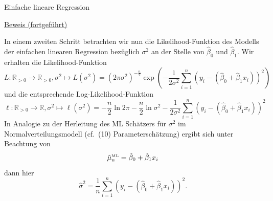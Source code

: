 \documentclass[
  8pt,
  ignorenonframetext,
]{beamer}
\begin{document}
\begin{frame}{Einfache lineare Regression}
\protect\hypertarget{einfache-lineare-regression-8}{}
\tiny
\setlength{\abovedisplayskip}{1pt}
\setlength{\belowdisplayskip}{1pt}

\underline{Beweis (fortgeführt)}

In einem zweiten Schritt betrachten wir nun die Likelihood-Funktion des
Modells der einfachen linearen Regression bezüglich \(\sigma^2\) an der
Stelle von \(\hat{\beta}_0\) und \(\hat{\beta}_1\). Wir erhalten die
Likelihood-Funktion \begin{equation}
L : \mathbb{R}_{>0} \to \mathbb{R}_{>0}, \sigma^2 \mapsto L(\sigma^2)
 = \left(2\pi\sigma^2\right)^{-\frac{n}{2}}\exp\left(-\frac{1}{2\sigma^2}\sum_{i=1}^n(y_i - (\hat{\beta}_0 + \hat{\beta}_1x_i))^2\right)
\end{equation} und die entsprechende Log-Likelihood-Funktion
\begin{equation}
\ell : \mathbb{R}_{>0} \to \mathbb{R}, \sigma^2 \mapsto \ell(\sigma^2)
 = -\frac{n}{2} \ln 2\pi - \frac{n}{2} \ln \sigma^2 -\frac{1}{2\sigma^2}\sum_{i=1}^n(y_i - (\hat{\beta}_0 + \hat{\beta}_1x_i))^2
\end{equation} In Analogie zu der Herleitung des ML Schätzers für
\(\sigma^2\) im Normalverteilungsmodell (cf.~(10) Parameterschätzung)
ergibt sich unter Beachtung von \begin{equation}
\hat{\mu}^{\mbox{\tiny ML}}_n = \hat{\beta}_0 + \hat{\beta}_1x_i
\end{equation} dann hier \begin{equation}
\hat{\sigma}^2 = \frac{1}{n}\sum_{i=1}^n (y_i - (\hat{\beta}_0 + \hat{\beta}_1x_i))^2.
\end{equation}
\end{frame}
\end{document}
